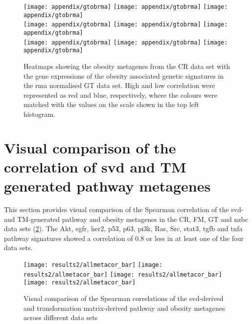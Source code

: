 	\begin{figure}[htp!]
		\centering
		\texttt{[image: appendix/gtobrma]}
		\texttt{[image: appendix/gtobrma]}
		\texttt{[image: appendix/gtobrma]}\\
		\texttt{[image: appendix/gtobrma]}
		\texttt{[image: appendix/gtobrma]}
		\texttt{[image: appendix/gtobrma]}\\
		\texttt{[image: appendix/gtobrma]}
		\texttt{[image: appendix/gtobrma]}
		\texttt{[image: appendix/gtobrma]}\\
		\caption[Heatmaps of all the obesity and the pathway metagenes in the CR, \gls{nzbc} and FM data]{Heatmaps showing the obesity metagenes from the CR data set with the gene expressions of the obesity associated genetic signatures in the \gls{rma} normalised GT data set.
		High and low correlation were represented as red and blue, respectively, where the colours were matched with the values on the scale shown in the top left histogram.}
		\label{fig:appendix/ob_meta_dir_gt}
	\end{figure}

	\newpage

	\section{Visual comparison of the correlation of \gls{svd} and TM generated pathway metagenes}
	\label{sec:comparison_of_the_correlation_of_svd_and_tm_generated_pathway_metagenes}

	This section provides visual comparison of the Spearman correlation of the \gls{svd}- and TM-generated pathway and obesity metagenes in the CR, FM, GT and \gls{nzbc} data sets (\cref{fig:allmetacor_bar_appendix}).
	The Akt, \gls{egfr}, \gls{her2}, p53, p63, \gls{pi3k}, Ras, Src, \gls{stat3}, \gls{tgfb} and \gls{tnfa} pathway signatures showed a correlation of 0.8 or less in at least one of the four data sets.

	\begin{figure}[htpb]
		\centering
		\texttt{[image: results2/allmetacor\_bar]}
		\texttt{[image: results2/allmetacor\_bar]}
		\texttt{[image: results2/allmetacor\_bar]}
		\texttt{[image: results2/allmetacor\_bar]}\\
		\caption[Bar plots showing the Spearman correlation of the \gls{svd}- and TM-derived obesity and pathway metagenes across different data sets]{Visual comparison of the Spearman correlations of the \gls{svd}-derived and transformation matrix-derived pathway and obesity metagenes across different data sets}
		\label{fig:allmetacor_bar_appendix}
	\end{figure}

